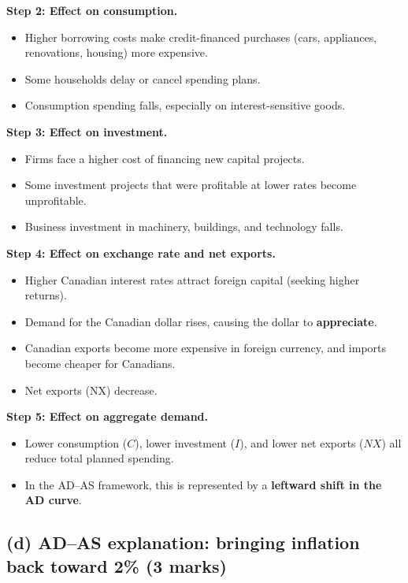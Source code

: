 \documentclass[12pt]{article}
\begin{document}
\textbf{Step 2: Effect on consumption.}
\begin{itemize}
    \item Higher borrowing costs make credit-financed purchases (cars, appliances, renovations, housing) more expensive.
    \item Some households delay or cancel spending plans.
    \item Consumption spending falls, especially on interest-sensitive goods.
\end{itemize}

\textbf{Step 3: Effect on investment.}
\begin{itemize}
    \item Firms face a higher cost of financing new capital projects.
    \item Some investment projects that were profitable at lower rates become unprofitable.
    \item Business investment in machinery, buildings, and technology falls.
\end{itemize}

\textbf{Step 4: Effect on exchange rate and net exports.}
\begin{itemize}
    \item Higher Canadian interest rates attract foreign capital (seeking higher returns).
    \item Demand for the Canadian dollar rises, causing the dollar to \textbf{appreciate}.
    \item Canadian exports become more expensive in foreign currency, and imports become cheaper for Canadians.
    \item Net exports (NX) decrease.
\end{itemize}

\textbf{Step 5: Effect on aggregate demand.}
\begin{itemize}
    \item Lower consumption (\(C\)), lower investment (\(I\)), and lower net exports (\(NX\)) all reduce total planned spending.
    \item In the AD--AS framework, this is represented by a \textbf{leftward shift in the AD curve}.
\end{itemize}

\subsection*{(d) AD--AS explanation: bringing inflation back toward 2\% (3 marks)}
\end{document}
